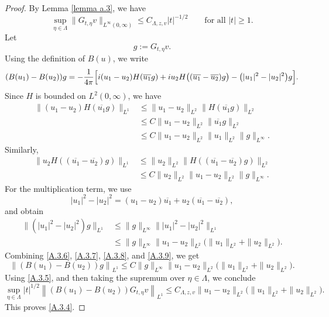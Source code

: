 \documentclass[10pt]{article}
\numberwithin{equation}{section}
\numberwithin{theorem}{section}
\begin{document}
\begin{appendix}
\begin{proof}
By Lemma \ref{lemma a.3}, we have
\begin{equation}
\label{A.3.5}
\sup_{\eta\in\Lambda}
\|G_{t,\eta}v\|_{L^\infty(0,\infty)}
\le
C_{\Lambda,z,v}|t|^{-1/2}
\qquad\text{for all } |t|\ge1 .
\end{equation}
Let
\[
g:=G_{t,\eta}v.
\]
Using the definition of \(B(u)\), we write
\begin{equation}
\label{A.3.6}
(B(u_1)-B(u_2))g
=
-\frac1{4\pi}
\Bigl[
i(u_1-u_2)H(\overline{u_1}g)
+
iu_2H\bigl((\overline{u_1}-\overline{u_2})g\bigr) 
-
\bigl(|u_1|^2-|u_2|^2\bigr)g
\Bigr].
\end{equation}
Since \(H\) is bounded on \(L^2(0,\infty)\), we have
\begin{equation}
\label{A.3.7}
\begin{aligned}
\|(u_1-u_2)H(\overline{u_1}g)\|_{L^1}
&\le
\|u_1-u_2\|_{L^2}
\|H(\overline{u_1}g)\|_{L^2}  \\
&\le
C
\|u_1-u_2\|_{L^2}
\|\overline{u_1}g\|_{L^2}  \\
&\le
C
\|u_1-u_2\|_{L^2}
\|u_1\|_{L^2}
\|g\|_{L^\infty}.
\end{aligned}
\end{equation}
Similarly,
\begin{equation}
\label{A.3.8}
\begin{aligned}
\|u_2H((\overline{u_1}-\overline{u_2})g)\|_{L^1}
&\le
\|u_2\|_{L^2}
\|H((\overline{u_1}-\overline{u_2})g)\|_{L^2}  \\
&\le
C
\|u_2\|_{L^2}
\|u_1-u_2\|_{L^2}
\|g\|_{L^\infty}.
\end{aligned}
\end{equation}
For the multiplication term, we use
\[
|u_1|^2-|u_2|^2
=
(u_1-u_2)\overline{u_1}
+
u_2(\overline{u_1}-\overline{u_2}),
\]
and obtain
\begin{equation}
\label{A.3.9}
\begin{aligned}
\bigl\|
(|u_1|^2-|u_2|^2)g
\bigr\|_{L^1}
&\le
\|g\|_{L^\infty}
\bigl\||u_1|^2-|u_2|^2\bigr\|_{L^1} \\
&\le
\|g\|_{L^\infty}
\|u_1-u_2\|_{L^2}
\bigl(
\|u_1\|_{L^2}+\|u_2\|_{L^2}
\bigr).
\end{aligned}
\end{equation}
Combining \eqref{A.3.6}, \eqref{A.3.7}, \eqref{A.3.8}, and \eqref{A.3.9}, we get
\[
\left\|
(B(u_1)-B(u_2))g
\right\|_{L^1}
\le
C
\|g\|_{L^\infty}
\|u_1-u_2\|_{L^2}
\bigl(
\|u_1\|_{L^2}+\|u_2\|_{L^2}
\bigr).
\]
Using \eqref{A.3.5}, and then taking the supremum over \(\eta\in\Lambda\), we conclude
\[
\sup_{\eta\in\Lambda}
|t|^{1/2}
\left\|
(B(u_1)-B(u_2))G_{t,\eta}v
\right\|_{L^1}
\le
C_{\Lambda,z,v}
\|u_1-u_2\|_{L^2}
\bigl(
\|u_1\|_{L^2}+\|u_2\|_{L^2}
\bigr).
\]
This proves \eqref{A.3.4}.
\end{proof}


\end{appendix}
\end{document}

